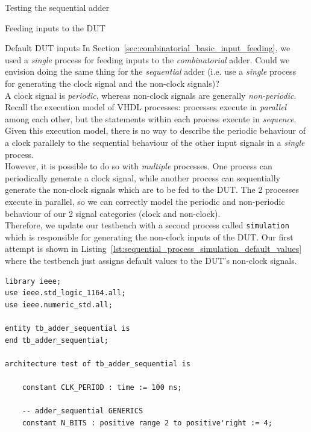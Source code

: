 \documentclass[lab]{course}
\begin{document}
\begin{section}{Testing the sequential adder}
\begin{subsection}{Feeding inputs to the DUT}
        \begin{subsubsection}{Default DUT inputs}
            In Section~\ref{sec:combinatorial_basic_input_feeding}, we used a \emph{single} process for feeding inputs to the \emph{combinatorial} adder. Could we envision doing the same thing for the \emph{sequential} adder (i.e. use a \emph{single} process for generating the clock signal and the non-clock signals)? \\

            A clock signal is \emph{periodic}, whereas non-clock signals are generally \emph{non-periodic}. Recall the execution model of VHDL processes: processes execute in \emph{parallel} among each other, but the statements within each process execute in \emph{sequence}. Given this execution model, there is no way to describe the periodic behaviour of a clock parallely to the sequential behaviour of the other input signals in a \emph{single} process. \\

            However, it is possible to do so with \emph{multiple} processes. One process can periodically generate a clock signal, while another process can sequentially generate the non-clock signals which are to be fed to the DUT. The 2 processes execute in parallel, so we can correctly model the periodic and non-periodic behaviour of our 2 signal categories (clock and non-clock). \\

            Therefore, we update our testbench with a second process called \verb+simulation+ which is responsible for generating the non-clock inputs of the DUT. Our first attempt is shown in Listing~\ref{lst:sequential_process_simulation_default_values} where the testbench just assigns default values to the DUT's non-clock signals.

            \begin{lstlisting}[caption={Add \texttt{simulation} process for generating non-clock signals to the DUT. This first version only assigns default values to the non-clock signals.}, label={lst:sequential_process_simulation_default_values}]
library ieee;
use ieee.std_logic_1164.all;
use ieee.numeric_std.all;

entity tb_adder_sequential is
end tb_adder_sequential;

architecture test of tb_adder_sequential is

    constant CLK_PERIOD : time := 100 ns;

    -- adder_sequential GENERICS
    constant N_BITS : positive range 2 to positive'right := 4;


\end{lstlisting}
\end{subsubsection}
\end{subsection}
\end{section}
\end{document}
